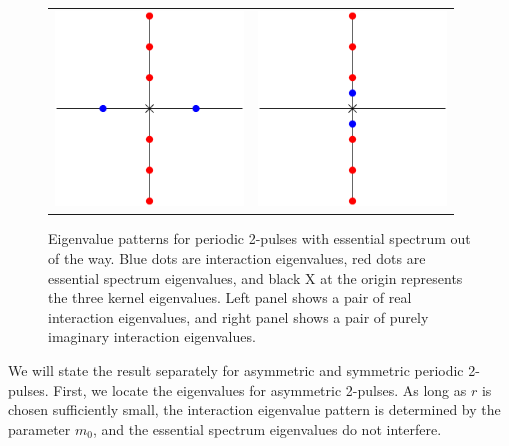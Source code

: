\documentclass[thesis.tex]{subfiles}
\begin{document}
\begin{figure}
\begin{center}
\begin{tabular}{cc}
\includegraphics[width=5cm]{images/kdv5/2punstableeigpattern.eps} &
\includegraphics[width=5cm]{images/kdv5/2pstableeigpattern.eps} 
\end{tabular}
\caption[Eigenvalue patterns for periodic 2-pulses]{Eigenvalue patterns for periodic 2-pulses with essential spectrum out of the way. Blue dots are interaction eigenvalues, red dots are essential spectrum eigenvalues, and black X at the origin represents the three kernel eigenvalues. Left panel shows a pair of real interaction eigenvalues, and right panel shows a pair of purely imaginary interaction eigenvalues.}
\label{fig:2ppatterns}
\end{center}
\end{figure}

We will state the result separately for asymmetric and symmetric periodic 2-pulses. First, we locate the eigenvalues for asymmetric 2-pulses. As long as $r$ is chosen sufficiently small, the interaction eigenvalue pattern is determined by the parameter $m_0$, and the essential spectrum eigenvalues do not interfere.
\end{document}
